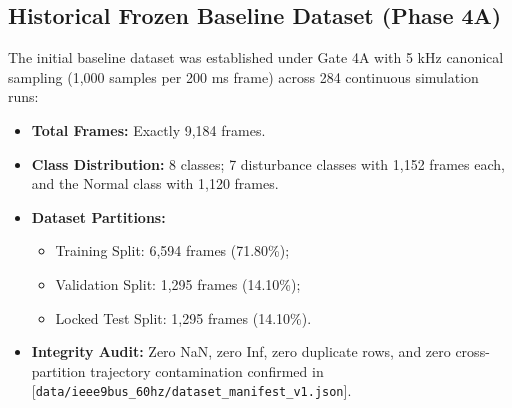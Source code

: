 \documentclass[12pt,a4paper]{report}
\begin{document}
\subsection{Historical Frozen Baseline Dataset (Phase 4A)}
The initial baseline dataset was established under Gate 4A with 5 kHz canonical sampling (1,000 samples per 200 ms frame) across 284 continuous simulation runs:
\begin{itemize}
    \item \textbf{Total Frames:} Exactly 9,184 frames.
    \item \textbf{Class Distribution:} 8 classes; 7 disturbance classes with 1,152 frames each, and the Normal class with 1,120 frames.
    \item \textbf{Dataset Partitions:}
    \begin{itemize}
        \item Training Split: 6,594 frames (71.80\%);
        \item Validation Split: 1,295 frames (14.10\%);
        \item Locked Test Split: 1,295 frames (14.10\%).
    \end{itemize}
    \item \textbf{Integrity Audit:} Zero NaN, zero Inf, zero duplicate rows, and zero cross-partition trajectory contamination confirmed in [\texttt{data/ieee9bus\_60hz/dataset\_manifest\_v1.json}].
\end{itemize}
\end{document}
